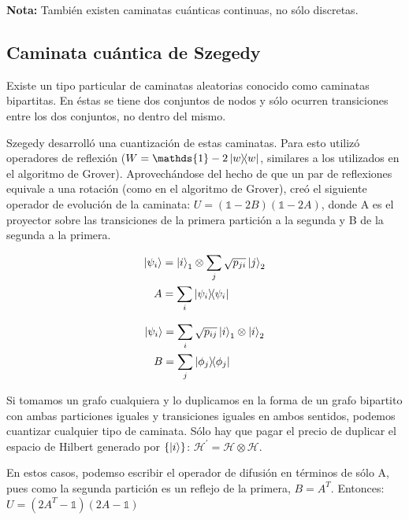 \documentclass[11pt, spanish]{report}
\begin{document}
\textbf{Nota:} También existen caminatas cuánticas continuas, no sólo discretas.

\subsection{Caminata cuántica de Szegedy}

Existe un tipo particular de caminatas aleatorias conocido como caminatas
bipartitas. En éstas se tiene dos conjuntos de nodos y sólo ocurren transiciones
entre los dos conjuntos, no dentro del mismo.


Szegedy desarrolló una cuantización de estas caminatas. Para esto utilizó
operadores de reflexión ($W = \mathds{1} - 2 \ketbra{w}{w}$, similares a los
utilizados en el algoritmo de Grover). Aprovechándose del hecho de que un par de
reflexiones equivale a una rotación (como en el algoritmo de Grover), creó el
siguiente operador de evolución de la caminata: $U = (\mathds{1} - 2
B)(\mathds{1} - 2 A)$, donde A es el proyector sobre las transiciones de la
primera partición a la segunda y B de la segunda a la primera.

\begin{minipage}{0.5\linewidth}
\begin{align*}
\ket{\psi_i} &= \ket{i}_1 \otimes \sum\limits_j \sqrt{p_{j i}} \ket{j}_2 \\
A &= \sum\limits_i \ketbra{\psi_i}{\psi_i}
\end{align*}
\end{minipage}
\begin{minipage}{0.5\linewidth}
\begin{align*}
\ket{\psi_i} &= \sum\limits_i \sqrt{p_{i j}} \ket{i}_1 \otimes \ket{i}_2 \\
B &= \sum\limits_j \ketbra{\phi_j}{\phi_j}
\end{align*}
\end{minipage}

Si tomamos un grafo cualquiera y lo duplicamos en la forma de un grafo bipartito
con ambas particiones iguales y transiciones iguales en ambos sentidos, podemos
cuantizar cualquier tipo de caminata. Sólo hay que pagar el precio de duplicar
el espacio de Hilbert generado por $\{\ket{i}\}$: $\mathcal{H}^\prime = \mathcal{H} \otimes \mathcal{H}$.


En estos casos, podemso escribir el operador de difusión en términos de sólo A,
pues como la segunda partición es un reflejo de la primera, $B = A^T$. Entonces:
$U = (2 A^T - \mathds{1})(2 A - \mathds{1})$
\end{document}
